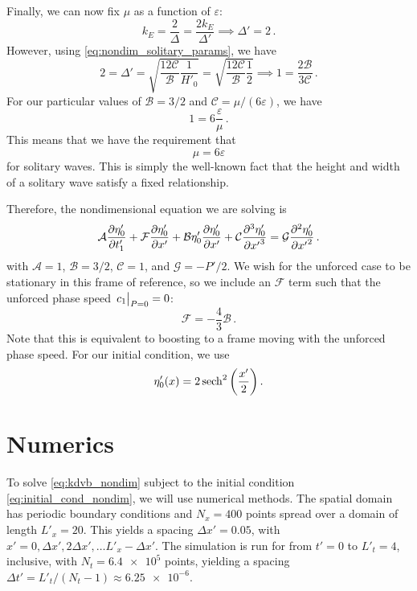 \documentclass{jfm}
\renewcommand*{\epsilon}{\varepsilon}
\begin{document}
Finally, we can now fix $\mu$ as a function of $\epsilon$:
\begin{equation}
  k_E = \frac{2}{\Delta} = \frac{2 k_E}{\Delta'}
  \implies \Delta' = 2 \,.
\end{equation}
However, using \cref{eq:nondim_solitary_params}, we have
\begin{equation}
  2 = \Delta ' = \sqrt{\frac{12 \mathcal{C}}{\mathcal{B}}
    \frac{1}{H'_0}}
  = \sqrt{\frac{12 \mathcal{C}}{\mathcal{B}} \frac{1}{2}}
  \implies 1 = \frac{2 \mathcal{B}}{3 \mathcal{C}} \,.
\end{equation}
For our particular values of $\mathcal{B} = 3/2$ and $\mathcal{C} =
\mu/(6 \epsilon)$, we have
\begin{equation}
  1 = 6 \frac{\epsilon}{\mu} \,.
\end{equation}
This means that we have the requirement that
\begin{equation}
  \mu = 6 \epsilon
\end{equation}
for solitary waves.
This is simply the well-known fact that the height and width of a
solitary wave satisfy a fixed relationship.

Therefore, the nondimensional equation we are solving is
\begin{equation}
  \mathcal{A} \pdv{\eta'_0}{t'_1} + \mathcal{F} \pdv{\eta'_0}{x'} + \mathcal{B}
  \eta'_0 \pdv{\eta'_0}{x'} + \mathcal{C} \pdv[3]{\eta'_0}{{x'}} =
  \mathcal{G} \pdv[2]{\eta'_0}{{x'}} \,.
  \label{eq:kdvb_nondim}
\end{equation}
with $\mathcal{A} = 1$, $\mathcal{B} = 3/2$, $\mathcal{C} = 1$, and
$\mathcal{G} = -P'/2$.
We wish for the unforced case to be stationary in this frame of
reference, so we include an $\mathcal{F}$ term such that the unforced
phase speed $\eval{c_1}_{P=0} = 0$:
\begin{equation}
  \mathcal{F} = -\frac{4}{3} \mathcal{B} \,.
\end{equation}
Note that this is equivalent to boosting to a frame moving with the
unforced phase speed.
For our initial condition, we use
\begin{equation}
  \eta'_0(x) = 2 \sech^2\pqty{\frac{x'}{2}} \,.
  \label{eq:initial_cond_nondim}
\end{equation}

\section{Numerics}
To solve \cref{eq:kdvb_nondim} subject to the initial condition
\cref{eq:initial_cond_nondim}, we will use numerical methods.
The spatial domain has periodic boundary conditions and $N_x = 400$
points spread over a domain of length $L'_x = 20$.
This yields a spacing $\Delta x' = 0.05$, with $x' = 0, \Delta x',
2\Delta x', \ldots L'_x - \Delta x'$.
The simulation is run for from $t'= 0$ to $L'_t = 4$, inclusive, with
$N_t = \num{6.4e5}$ points, yielding a spacing $\Delta t' = L'_t/(N_t-1)
\approx \num{6.25e-6}$.
\end{document}
